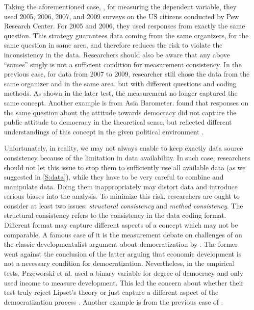 Taking the aforementioned case, \cite{Newman2015}, for measuring the dependent variable, they used 2005, 2006, 2007, and 2009 surveys on the US citizens conducted by Pew Research Center. For 2005 and 2006, they used responses from exactly the same question. This strategy guarantees data coming from the same organizers, for the same question in same area, and therefore reduces the risk to violate the inconsistency in the data. Researchers should also be aware that any above ``sames'' singly is not a sufficient condition for measurement consistency. In the previous case, for data from 2007 to 2009, researcher still chose the data from the same organizer and in the same area, but with different questions and coding methods. As shown in the later test, the measurement no longer captured the same concept. Another example is from Asia Barometer. \cite{Chu2010} found that responses on the same question about the attitude towards democracy did not capture the public attitude to democracy in the theoretical sense, but reflected different understandings of this concept in the given political environment \cite[see, also, ][]{Lu2014a}.

Unfortunately, in reality, we may not always enable to keep exactly data source consistency because of the limitation in data availability. In such case, researchers should not let this issue to stop them to sufficiently use all available data (as we suggested in \cref{S:data}), while they have to be very careful to combine and manipulate data. Doing them inappropriately may distort data and introduce serious biases into the analysis. To minimize this risk, researchers are ought to consider at least two issues: \textit{structural consistency} and \textit{method consistency}. The structural consistency refers to the consistency in the data coding format. Different format may capture different aspects of a concept which may not be comparable. A famous case of it is the measurement debate on challenges of \cite{Przeworski2000} on the classic developmentalist argument about democratization by \cite{Lipset1960}. The former went against the conclusion of the latter arguing that economic development is not a necessary condition for democratization. Nevertheless, in the empirical tests, Przeworski et al. used a binary variable for degree of democracy and only used income to measure development. This led the concern about whether their test truly reject Lipset's theory or just capture a different aspect of the democratization process \cite[not very sure if this citation is adequate][]{Bernhagen2009}. Another example is from the previous case of \cite{Newman2015}.

